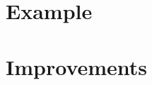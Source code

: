 \documentclass{article}
\begin{document}
\section{Example}

\newpage
\section{Improvements}
\end{document}
